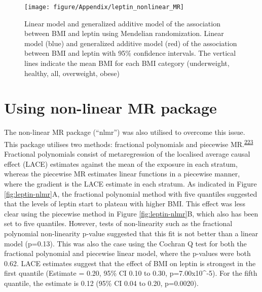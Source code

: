 \documentclass[11pt,twoside]{bristolthesis}
\begin{document}
\begin{figure}

{\centering \texttt{[image: figure/Appendix/leptin\_nonlinear\_MR]} 

}

\caption[Linear model and generalized additive model of the association between BMI and leptin using Mendelian randomization]{Linear model and generalized additive model of the association between BMI and leptin using Mendelian randomization. Linear model (blue) and generalized additive model (red) of the association between BMI and leptin with 95\% confidence intervals. The vertical lines indicate the mean BMI for each BMI category (underweight, healthy, all, overweight, obese)}\label{fig:leptin-lm-GAM-MR}
\end{figure}
\hypertarget{using-non-linear-mr-package}{%
\section{Using non-linear MR package}\label{using-non-linear-mr-package}}

The non-linear MR package (``nlmr'') was also utilised to overcome this issue. This package utilises two methods: fractional polynomials and piecewise MR.\textsuperscript{\protect\hyperlink{ref-Staley2017}{223}} Fractional polynomials consist of metaregression of the localised average causal effect (LACE) estimates against the mean of the exposure in each stratum, whereas the piecewise MR estimates linear functions in a piecewise manner, where the gradient is the LACE estimate in each stratum. As indicated in Figure \ref{fig:leptin-nlmr}A, the fractional polynomial method with five quantiles suggested that the levels of leptin start to plateau with higher BMI. This effect was less clear using the piecewise method in Figure \ref{fig:leptin-nlmr}B, which also has been set to five quantiles. However, tests of non-linearity such as the fractional polynomial non-linearity p-value suggested that this fit is not better than a linear model (p=0.13). This was also the case using the Cochran Q test for both the fractional polynomial and piecewise linear model, where the p-values were both 0.62. LACE estimates suggest that the effect of BMI on leptin is strongest in the first quantile (Estimate = 0.20, 95\% CI 0.10 to 0.30, p=7.00x10\^{}-5). For the fifth quantile, the estimate is 0.12 (95\% CI 0.04 to 0.20, p=0.0020).
\end{document}
